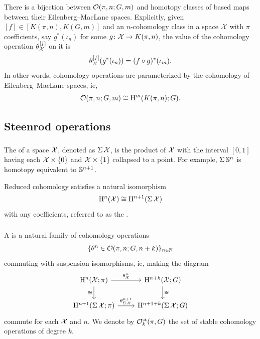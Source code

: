 \subsubsection{}
There is a bijection between $\mathcal{O}(\pi, n; G,m)$ and homotopy classes of based maps between their Eilenberg--MacLane spaces.
Explicitly, given $[f] \in [K(\pi,n), K(G,m)]$ and an $n$-cohomology class in a space $\mathcal{X}$ with $\pi$ coefficients, say $g^*(\iota_n)$ for some $g \colon \mathcal{X} \to K(\pi, n)$, the value of the cohomology operation $\theta_{\mathcal{X}}^{[f]}$ on it is
\[
\theta_{\mathcal{X}}^{[f]}(g^*(\iota_n)) = (f \circ g)^*(\iota_m).
\]
In other words, cohomology operations are parameterized by the cohomology of Eilenberg--MacLane spaces, ie,
\[
\mathcal{O}(\pi, n; G,m) \cong \mathrm{H}^m(K(\pi,n); G).
\]

\subsection{Steenrod operations}\label{ss:steenrod}

\subsubsection{}

The  of a space $\mathcal{X}$, denoted as $\operatorname{\Sigma} \mathcal{X}$, is the product of $\mathcal{X}$ with the interval $[0,1]$ having each $\mathcal{X} \times \{0\}$ and $\mathcal{X} \times \{1\}$ collapsed to a point.
For example, $\operatorname{\Sigma} \mathbb{S}^n$ is homotopy equivalent to $\mathbb{S}^{n+1}$.

Reduced cohomology satisfies a natural isomorphism
\[
\mathrm{H}^n(\mathcal{X}) \cong \mathrm{H}^{n+1}(\operatorname{\Sigma} \mathcal{X})
\]
with any coefficients, referred to as the .

\subsubsection{}

A  is a natural family of cohomology operations
\[
\{\theta^n \in \mathcal{O}(\pi, n; G, n+k)\}_{n \in \mathbb{N}}
\]
commuting with suspension isomorphisms, ie, making the diagram
\[
\begin{tikzcd}
	\rH^n(\cX; \pi) \rar["\theta^n_\cX"] \dar["\cong" left] & \rH^{n+k}(\cX; G) \dar["\cong" right] \\
	\rH^{n+1}(\sus\cX; \pi) \rar["\theta^{n+1}_{\sus\cX}"] & \rH^{n+1+k}(\sus\cX; G)
\end{tikzcd}
\]
commute for each \(\mathcal{X}\) and \(n\).
We denote by \(\mathcal{O}^{\mathrm{st}}_k(\pi, G)\) the set of stable cohomology operations of degree \(k\).

